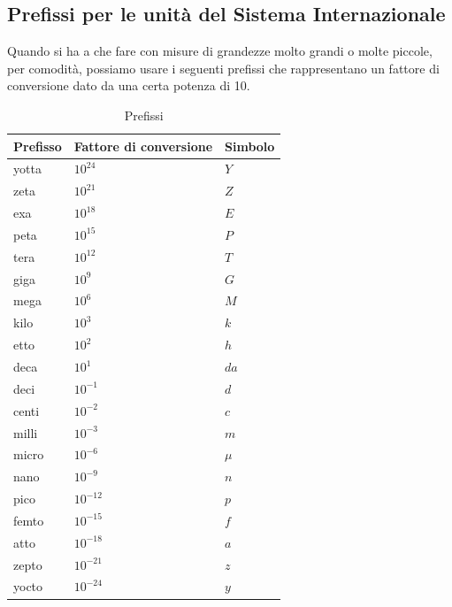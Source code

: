 \documentclass{report}
\begin{document}

\subsection{Prefissi per le unità del Sistema Internazionale} %
\label{sub:Prefissi per le unità del Sistema Internazionale}

Quando si ha a che fare con misure di grandezze molto grandi o molte piccole, per comodità, possiamo usare i seguenti prefissi che rappresentano un fattore di conversione dato da una certa potenza di 10.
\\
\begin{table}[h]
  \caption{Prefissi}\label{tab:}
  \begin{center}
    \begin{tabular}[c]{|l|l|l|}
      \hline
      Prefisso & Fattore di conversione & Simbolo \\
      \hline
      yotta   & $10^{24}$  & $Y$ \\
      \hline
      zeta    & $10^{21}$  & $Z$ \\
      \hline
      exa     & $10^{18}$  & $E$ \\
      \hline 
      peta    & $10^{15}$  & $P$ \\
      \hline 
      tera    & $10^{12}$  & $T$ \\
      \hline 
      giga    & $10^9$     & $G$ \\
      \hline 
      mega    & $10^6$     & $M$ \\
      \hline 
      kilo    & $10^3$     & $k$ \\
      \hline 
      etto    & $10^2$     & $h$ \\
      \hline 
      deca    & $10^1$     & $da$ \\
      \hline
      deci    & $10^{-1}$  & $d$ \\
      \hline
      centi   & $10^{-2}$  & $c$ \\
      \hline 
      milli   & $10^{-3}$  & $m$ \\
      \hline 
      micro   & $10^{-6}$  & $\mu$ \\ 
      \hline
      nano    & $10^{-9}$  & $n$ \\
      \hline
      pico    & $10^{-12}$ & $p$ \\
      \hline
      femto   & $10^{-15}$ & $f$ \\
      \hline
      atto    & $10^{-18}$ & $a$ \\
      \hline
      zepto   & $10^{-21}$ & $z$ \\
      \hline
      yocto   & $10^{-24}$ & $y$ \\
      \hline
    \end{tabular}
  \end{center}
\end{table}
\end{document}
